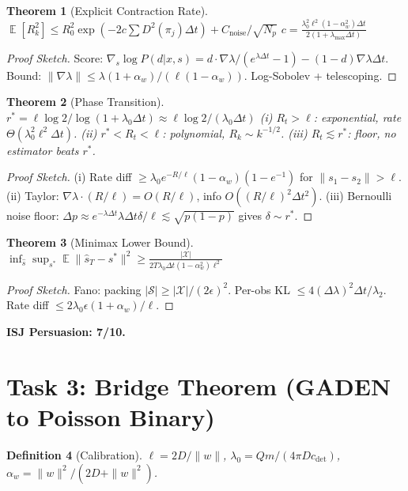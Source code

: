 \documentclass[11pt]{article}
\newtheorem{theorem}{Theorem}
\newtheorem{definition}[theorem]{Definition}
\DeclareMathOperator{\E}{\mathbb{E}}
\begin{document}
\begin{theorem}[Explicit Contraction Rate]\label{thm:explicit_contraction}
$\E[R_k^2]\leq R_0^2\exp(-2c\sum D^2(\pi_j)\Delta t)+C_{\mathrm{noise}}/\sqrt{N_p}$
$\boxed{c=\frac{\lambda_0^2\ell^2(1-\alpha_w^2)\Delta t}{2(1+\lambda_{\max}\Delta t)}}$
\end{theorem}
\begin{proof}[Proof Sketch]
Score: $\nabla_s\log P(d|x,s)=d\cdot\nabla\lambda/(e^{\lambda\Delta t}-1)-(1-d)\nabla\lambda\Delta t$. Bound: $\|\nabla\lambda\|\leq\lambda(1+\alpha_w)/(\ell(1-\alpha_w))$. Log-Sobolev + telescoping.
\end{proof}

\begin{theorem}[Phase Transition]\label{thm:phase_transition}
$\boxed{r^*=\ell\log 2/\log(1+\lambda_0\Delta t)\approx\ell\log 2/(\lambda_0\Delta t)}$
(i) $R_t>\ell$: exponential, rate $\Theta(\lambda_0^2\ell^2\Delta t)$.
(ii) $r^*<R_t<\ell$: polynomial, $R_k\sim k^{-1/2}$.
(iii) $R_t\lesssim r^*$: floor, no estimator beats $r^*$.
\end{theorem}
\begin{proof}[Proof Sketch]
(i) Rate diff $\geq\lambda_0 e^{-R/\ell}(1-\alpha_w)(1-e^{-1})$ for $\|s_1-s_2\|>\ell$.
(ii) Taylor: $\nabla\lambda\cdot(R/\ell)=O(R/\ell)$, info $O((R/\ell)^2\Delta t^2)$.
(iii) Bernoulli noise floor: $\Delta p\approx e^{-\lambda\Delta t}\lambda\Delta t\delta/\ell\lesssim\sqrt{p(1-p)}$ gives $\delta\sim r^*$.
\end{proof}

\begin{theorem}[Minimax Lower Bound]\label{thm:minimax}
$\inf_{\hat s}\sup_{s^*}\E\|\hat s_T-s^*\|^2\geq\frac{|\mathcal{X}|}{2T\lambda_0\Delta t(1-\alpha_w^2)\ell^2}$
\end{theorem}
\begin{proof}[Proof Sketch]
Fano: packing $|\mathcal{S}|\geq|\mathcal{X}|/(2\epsilon)^2$. Per-obs KL $\leq 4(\Delta\lambda)^2\Delta t/\lambda_2$. Rate diff $\leq 2\lambda_0\epsilon(1+\alpha_w)/\ell$.
\end{proof}

\medskip\noindent\textbf{ISJ Persuasion: 7/10.}

\newpage
\section{Task 3: Bridge Theorem (GADEN to Poisson Binary)}

\begin{definition}[Calibration]
$\ell=2D/\|w\|$, $\lambda_0=Qm/(4\pi D c_{\mathrm{det}})$, $\alpha_w=\|w\|^2/(2D+\|w\|^2)$.
\end{definition}
\end{document}
